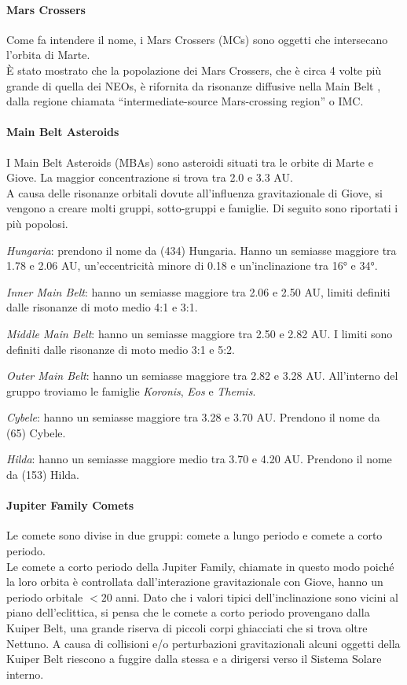 \documentclass[a4paper,11pt,openright]{book}
\begin{document}
\paragraph*{Mars Crossers}
Come fa intendere il nome, i Mars Crossers (MCs) sono oggetti che intersecano l’orbita di Marte.\\
È stato mostrato che la popolazione dei Mars Crossers, che è circa 4 volte più grande di quella dei NEOs, è rifornita da risonanze diffusive nella Main Belt \citep{migliorini_origin_1998, morbidelli_numerous_1999, michel_population_2000, bottke_debiased_2002}, dalla regione chiamata “intermediate-source Mars-crossing region” o IMC.

\paragraph*{Main Belt Asteroids}
I Main Belt Asteroids (MBAs) sono asteroidi situati tra le orbite di Marte e Giove. La maggior concentrazione si trova tra 2.0 e 3.3 AU.\\
A causa delle risonanze orbitali dovute all’influenza gravitazionale di Giove, si vengono a creare molti gruppi, sotto-gruppi e famiglie. Di seguito sono riportati i più popolosi.

\qquad \textit{Hungaria}: prendono il nome da (434) Hungaria. Hanno un semiasse maggiore tra 1.78 e 2.06 AU, un’eccentricità minore di 0.18 e un’inclinazione tra 16° e 34°. 

\qquad \textit{Inner Main Belt}: hanno un semiasse maggiore tra 2.06 e 2.50 AU, limiti definiti dalle risonanze di moto medio 4:1 e 3:1.

\qquad \textit{Middle Main Belt}: hanno un semiasse maggiore tra 2.50 e 2.82 AU. I limiti sono definiti dalle risonanze di moto medio 3:1 e 5:2.

\qquad \textit{Outer Main Belt}: hanno un semiasse maggiore tra 2.82 e 3.28 AU. All’interno del gruppo troviamo le famiglie \textit{Koronis}, \textit{Eos} e \textit{Themis}.

\qquad \textit{Cybele}: hanno un semiasse maggiore tra 3.28 e 3.70 AU. Prendono il nome da (65) Cybele.

\qquad \textit{Hilda}: hanno un semiasse maggiore medio tra 3.70 e 4.20 AU. Prendono il nome da (153) Hilda.

\paragraph*{Jupiter Family Comets}
Le comete sono divise in due gruppi: comete a lungo periodo e comete a corto periodo.\\
Le comete a corto periodo della Jupiter Family, chiamate in questo modo poiché la loro orbita è controllata dall'interazione gravitazionale con Giove, hanno un periodo orbitale $< 20$ anni. 
Dato che i valori tipici dell'inclinazione sono vicini al piano dell'eclittica, si pensa che le comete a corto periodo provengano dalla Kuiper Belt, una grande riserva di piccoli corpi ghiacciati che si trova oltre Nettuno. A causa di collisioni e/o perturbazioni gravitazionali alcuni oggetti della Kuiper Belt riescono a fuggire dalla stessa e a dirigersi verso il Sistema Solare interno.
\end{document}
